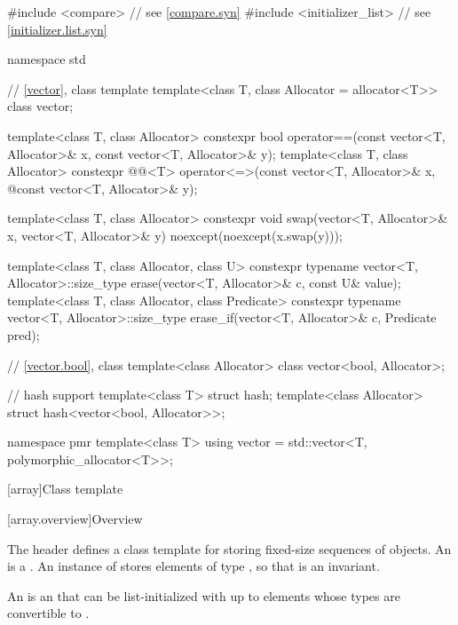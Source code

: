 %
\begin{codeblock}
#include <compare>              // see \ref{compare.syn}
#include <initializer_list>     // see \ref{initializer.list.syn}

namespace std {
  // \ref{vector}, class template 
  template<class T, class Allocator = allocator<T>> class vector;

  template<class T, class Allocator>
    constexpr bool operator==(const vector<T, Allocator>& x, const vector<T, Allocator>& y);
  template<class T, class Allocator>
    constexpr @@<T> operator<=>(const vector<T, Allocator>& x,
              @\itcorr@                                      const vector<T, Allocator>& y);

  template<class T, class Allocator>
    constexpr void swap(vector<T, Allocator>& x, vector<T, Allocator>& y)
      noexcept(noexcept(x.swap(y)));

  template<class T, class Allocator, class U>
    constexpr typename vector<T, Allocator>::size_type
      erase(vector<T, Allocator>& c, const U& value);
  template<class T, class Allocator, class Predicate>
    constexpr typename vector<T, Allocator>::size_type
      erase_if(vector<T, Allocator>& c, Predicate pred);

  // \ref{vector.bool}, class 
  template<class Allocator> class vector<bool, Allocator>;

  // hash support
  template<class T> struct hash;
  template<class Allocator> struct hash<vector<bool, Allocator>>;

  namespace pmr {
    template<class T>
      using vector = std::vector<T, polymorphic_allocator<T>>;
  }
}
\end{codeblock}

[array]{Class template }
%

[array.overview]{Overview}

\pnum
{}%
The header  defines a class template for storing fixed-size
sequences of objects.
An  is a .
An instance of  stores  elements of type ,
so that  is an invariant.

\pnum
{}%
%
An  is an  that can be
list-initialized with up
to  elements whose types are convertible to .

